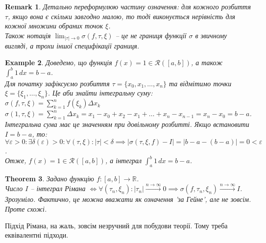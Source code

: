 \documentclass[a4paper, 10pt]{article}
\def\huge{\displaystyle}
\theoremstyle{theoremdd}
\newtheorem{theorem}{Theorem}[subsection]
\theoremstyle{theoremdd}
\theoremstyle{theoremdd}
\theoremstyle{theoremdd}
\theoremstyle{theoremdd}
\newtheorem{example}[theorem]{Example}
\theoremstyle{theoremdd}
\theoremstyle{theoremdd}
\newtheorem{remark}[theorem]{Remark}
\theoremstyle{theoremdd}
\theoremstyle{theoremdd}
\begin{document}
\begin{remark}
Детально переформулюю частину означення: для кожного розбиття $\tau$, якщо вона є скільки завгодно малою, то тоді виконується нерівність для кожної множини обраних точок $\xi$.\\
Також нотація $\huge\lim_{|\tau| \to 0} \sigma(f,\tau,\xi)$ -- це не границя функції $\sigma$ в звичному вигляді, а трохи іншої специфікації границя.
\end{remark}

\begin{example}
Доведемо, що функція $f(x) = 1 \in \mathcal{R}([a,b])$, а також $\huge \int_a^b 1\,dx = b-a$.\\
Для початку зафіксуємо розбиття $\tau = \{x_0,x_1,\dots,x_n\}$ та відмітимо точки $\xi = \{\xi_1,\dots,\xi_n\}$. Це аби знайти інтегральну суму:\\
$\sigma (f, \tau, \xi) = \huge \sum_{k=1}^n f(\xi_k) \Delta x_k$\\
$\sigma (1, \tau, \xi) = \huge \sum_{k=1}^n \Delta x_k = x_1 - x_0 + x_2 - x_1 + \dots + x_n - x_{n-1} = x_n - x_0 = b - a$.\\
Інтегральна сума має це значенням при довільному розбитті. Якщо встановити $I = b -a$, то:\\
$\forall \varepsilon > 0: \exists \delta(\varepsilon) > 0: \forall (\tau, \xi): |\tau| < \delta \implies |\sigma (\tau, \xi, f) - I| = |b-a - (b-a)| = 0 < \varepsilon$.\\
Отже, $f(x) = 1 \in \mathcal{R}([a,b])$, а інтеграл $\huge \int_a^b 1\,dx = b-a$.
\end{example}

\begin{theorem}
Задано функцію $f \colon [a,b] \to \mathbb{R}$.\\
Число $I$ -- інтеграл Рімана $\iff \forall (\tau_n, \xi_n): |\tau_n| \overset{n \to \infty}{\longrightarrow} 0 \implies \sigma(f, \tau_n, \xi_n) \overset{n \to \infty}{\longrightarrow} I$.\\
\textit{Зрозуміло. Фактично, це можна вважати як означення 'за Гейне', але не зовсім. Проте схожі.}
\end{theorem}

Підхід Рімана, на жаль, зовсім незручний для побудови теорії. Тому треба еквівалентні підходи.
\end{document}
